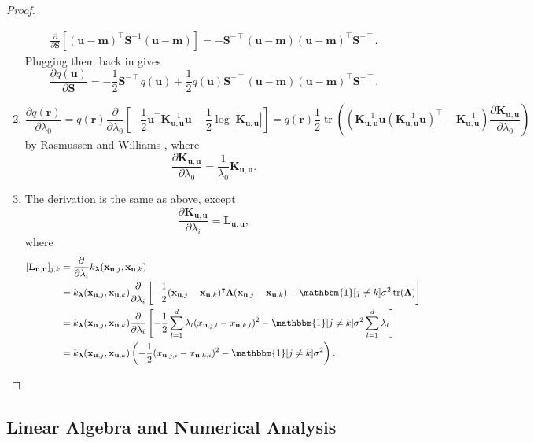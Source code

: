 \documentclass{article}
\theoremstyle{definition}
\DeclareMathOperator{\tr}{tr}
\newcommand{\Kuu}{\mathbf{K}_{\mathbf{u},\mathbf{u}}}
\newcommand{\Luu}{\mathbf{L}_{\mathbf{u},\mathbf{u}}}
\newcommand{\dS}{\frac{\partial}{\partial\mathbf{S}}}
\newcommand{\dlz}{\frac{\partial}{\partial \lambda_0}}
\newcommand{\dl}{\frac{\partial}{\partial \lambda_i}}
\begin{document}
\begin{proof}
\begin{enumerate}
\begin{gather*}
      \dS[(\mathbf{u} - \mathbf{m})^\intercal\mathbf{S}^{-1}(\mathbf{u} -
      \mathbf{m})] = -\mathbf{S}^{-\intercal}(\mathbf{u} - \mathbf{m})(\mathbf{u} -
                     \mathbf{m})^\intercal\mathbf{S}^{-\intercal}.
    \end{gather*}
    Plugging them back in gives
    \[ \frac{\partial q(\mathbf{u})}{\partial \mathbf{S}} =
      -\frac{1}{2}\mathbf{S}^{-\intercal}q(\mathbf{u}) +
      \frac{1}{2}q(\mathbf{u})\mathbf{S}^{-\intercal}(\mathbf{u} -
      \mathbf{m})(\mathbf{u} - \mathbf{m})^\intercal\mathbf{S}^{-\intercal}. \]
  \item
    \[ \frac{\partial q(\mathbf{r})}{\partial \lambda_0} = q(\mathbf{r}) \dlz
      \left[-\frac{1}{2}\mathbf{u}^\intercal\Kuu^{-1}\mathbf{u} -
        \frac{1}{2}\log|\Kuu| \right] = q(\mathbf{r})\frac{1}{2}\tr
      \left((\Kuu^{-1}\mathbf{u}(\Kuu^{-1}\mathbf{u})^\intercal - \Kuu^{-1})
        \frac{\partial \Kuu}{\partial \lambda_0} \right) \]
    by Rasmussen and Williams \cite{DBLP:books/lib/RasmussenW06}, where
    \[ \frac{\partial \Kuu}{\partial \lambda_0} = \frac{1}{\lambda_0}\Kuu. \]
  \item The derivation is the same as above, except
    \[ \frac{\partial \Kuu}{\partial \lambda_i} = \Luu, \]
    where
    \[
      \begin{split}
        [\Luu]_{j,k} &= \dl k_{\bm\lambda}(\mathbf{x}_{\mathbf{u},j},
        \mathbf{x}_{\mathbf{u},k}) \\
        &= k_{\bm\lambda}(\mathbf{x}_{\mathbf{u},j}, \mathbf{x}_{\mathbf{u},k})
        \dl \left[-\frac{1}{2}(\mathbf{x}_{\mathbf{u},j} -
          \mathbf{x}_{\mathbf{u},k})^\intercal \bm\Lambda
          (\mathbf{x}_{\mathbf{u},j} - \mathbf{x}_{\mathbf{u},k}) -
          \mathbbm{1}[j \ne k]\sigma^2\tr(\bm\Lambda) \right] \\
        &= k_{\bm\lambda}(\mathbf{x}_{\mathbf{u},j}, \mathbf{x}_{\mathbf{u},k})
        \dl \left[-\frac{1}{2}\sum_{l=1}^d \lambda_l
          (x_{\mathbf{u},j,l} - x_{\mathbf{u},k,l})^2 -
          \mathbbm{1}[j \ne k]\sigma^2\sum_{l=1}^d \lambda_l \right] \\
        &= k_{\bm\lambda}(\mathbf{x}_{\mathbf{u},j}, \mathbf{x}_{\mathbf{u},k})
        \left( -\frac{1}{2}(x_{\mathbf{u},j,i} -
        x_{\mathbf{u},k,i})^2 - \mathbbm{1}[j \ne k]\sigma^2 \right).
      \end{split}
    \]
  \end{enumerate}
\end{proof}

\subsection{Linear Algebra and Numerical Analysis}
\end{document}
